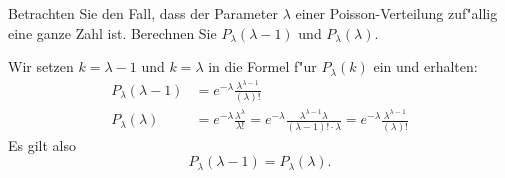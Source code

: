 Betrachten Sie den Fall, dass der Parameter $\lambda$ einer Poisson-Verteilung
zuf"allig eine ganze Zahl ist.
Berechnen Sie $P_\lambda(\lambda-1)$ und $P_\lambda(\lambda)$.

\begin{loesung}
Wir setzen $k=\lambda-1$ und $k=\lambda$ in die Formel f"ur $P_\lambda(k)$ ein
und erhalten:
\begin{align*}
P_\lambda(\lambda-1)
&=
e^{-\lambda}\frac{\lambda^{\lambda -1 }}{(\lambda)!}
\\
P_\lambda(\lambda)
&=
e^{-\lambda}\frac{\lambda^{\lambda}}{\lambda!}
=
e^{-\lambda}\frac{\lambda^{\lambda-1}\lambda}{(\lambda-1)!\cdot\lambda}
=
e^{-\lambda}\frac{\lambda^{\lambda -1 }}{(\lambda)!}
\end{align*}
Es gilt also
\[
P_\lambda(\lambda -1)=P_\lambda(\lambda).
\]
\end{loesung}

